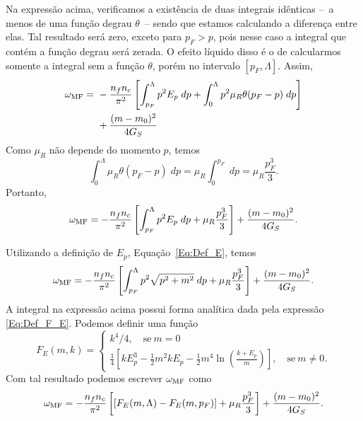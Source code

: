 Na expressão acima, verificamos a existência de duas integrais idênticas --~a menos de uma função degrau $\theta$~-- sendo que estamos calculando a diferença entre elas. Tal resultado será zero, exceto para $p_F > p$, pois nesse caso a integral que contém a função degrau será zerada. O efeito líquido disso é o de calcularmos somente a integral sem a função $\theta$, porém no intervalo $[p_F, \Lambda]$. Assim,
\begin{equation}
\begin{split}
\omega_{\rm{MF}} =&~ - \frac{n_f n_c}{\pi^2} \left[\int_{p_F}^\Lambda p^2E_p \; dp + \int_0^\Lambda p^2 \mu_R \theta(p_F - p)\;dp \right] \\
&~ + \frac{(m-m_0)^2}{4G_S} \\
\end{split}
\end{equation}
%
Como $\mu_R$ não depende do momento $p$, temos
\begin{equation}
	\int_0^\Lambda \mu_R \theta(p_F - p) \; dp = \mu_R \int_{0}^{p_F} \; dp = \mu_R\frac{p_F^3}{3}.
\end{equation}
%
Portanto,
\begin{equation}
\omega_{\rm{MF}} = - \frac{n_f n_c}{\pi^2} \left[\int_{p_F}^\Lambda p^2E_p \; dp + \mu_R \frac{p_F^3}{3} \right] + \frac{(m-m_0)^2}{4G_S}.
\end{equation}

Utilizando a definição de $E_p$, Equação~\eqref{Eq:Def_E}, temos
\begin{equation}
	\omega_{\rm{MF}} = - \frac{n_f n_c}{\pi^2} \left[\int_{p_F}^\Lambda p^2\sqrt{p^2 + m^2} \; dp + \mu_R \frac{p_F^3}{3} \right] + \frac{(m-m_0)^2}{4G_S}.
\end{equation}
%
A integral na expressão acima possui forma analítica dada pela expressão \eqref{Eq:Def_F_E}. Podemos definir uma função \begin{equation}
	F_E(m, k) = \begin{cases} k^4 / 4, \quad \textrm{se}~ m = 0 \\ \frac{1}{4}\left[kE_p^3 - \frac{1}{2}m^2kE_p - \frac{1}{2}m^4\ln\left(\frac{k + E_p}{m}\right)\right], \quad \textrm{se}~ m \neq 0. \end{cases}
\end{equation}
%
Com tal resultado podemos escrever $\omega_{\rm{MF}}$ como
\begin{equation}\label{Eq:Pot_termodinamico_1}
\omega_{\rm{MF}} = - \frac{n_f n_c}{\pi^2} \left[[F_E(m,\Lambda) - F_E(m, p_F)] + \mu_R \frac{p_F^3}{3} \right] + \frac{(m-m_0)^2}{4G_S}.
\end{equation}


